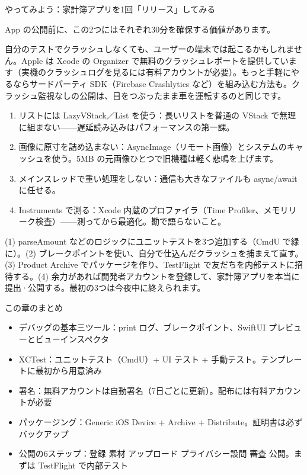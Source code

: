\begin{tcbpractice}{やってみよう：家計簿アプリを1回「リリース」してみる}

App の公開前に、この2つにはそれぞれ30分を確保する価値があります。


自分のテストでクラッシュしなくても、ユーザーの端末では起こるかもしれません。Apple は Xcode の Organizer で無料のクラッシュレポートを提供しています（実機のクラッシュログを見るには有料アカウントが必要）。もっと手軽にやるならサードパーティ SDK（Firebase Crashlytics など）を組み込む方法も。クラッシュ監視なしの公開は、目をつぶったまま車を運転するのと同じです。


\begin{enumerate}
  \item リストには LazyVStack／List を使う：長いリストを普通の VStack で無理に組まない——遅延読み込みはパフォーマンスの第一課。
  \item 画像に原寸を詰め込まない：AsyncImage（リモート画像）とシステムのキャッシュを使う。5MB の元画像ひとつで旧機種は軽く悲鳴を上げます。
  \item メインスレッドで重い処理をしない：通信も大きなファイルも async/await に任せる。
  \item Instruments で測る：Xcode 内蔵のプロファイラ（Time Profiler、メモリリーク検査）——測ってから最適化。勘で語らないこと。
\end{enumerate}

(1) parseAmount などのロジックにユニットテストを3つ追加する（CmdU で緑に）。(2) ブレークポイントを使い、自分で仕込んだクラッシュを捕まえて直す。(3) Product Archive でパッケージを作り、TestFlight で友だちを内部テストに招待する。(4) 余力があれば開発者アカウントを登録して、家計簿アプリを本当に提出·公開する。最初の3つは今夜中に終えられます。

\end{tcbpractice}

\begin{tcbsummary}{この章のまとめ}
\begin{itemize}
  \item デバッグの基本三ツール：print ログ、ブレークポイント、SwiftUI プレビューとビューインスペクタ
  \item XCTest：ユニットテスト（CmdU）+ UI テスト + 手動テスト。テンプレートに最初から用意済み
  \item 署名：無料アカウントは自動署名（7日ごとに更新）。配布には有料アカウントが必要
  \item パッケージング：Generic iOS Device + Archive + Distribute。証明書は必ずバックアップ
  \item 公開の6ステップ：登録 素材 アップロード プライバシー設問 審査 公開。まずは TestFlight で内部テスト
\end{itemize}

\end{tcbsummary}
